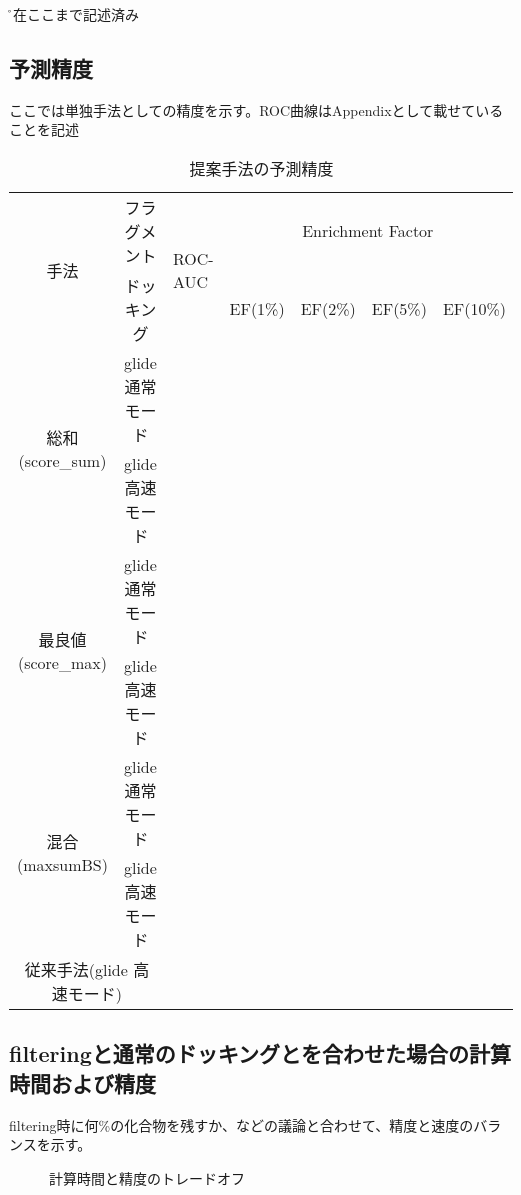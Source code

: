 \r{現在ここまで記述済み}

\subsection{予測精度}
ここでは単独手法としての精度を示す。ROC曲線はAppendixとして載せていることを記述

\begin{table}[htb] \centering
	\caption{提案手法の予測精度}
	\label{tb:filtering_accuracy}
	\begin{tabular}{c|c|lllll|}
	\multirow{2}{*}{手法}				&フラグメント		&\multirow{2}{*}{ROC-AUC}	&\multicolumn{4}{c}{Enrichment Factor}	\\
									&ドッキング		&						&EF(1\%)	&EF(2\%)	&EF(5\%)	&EF(10\%)	\\ \hline
	\multirow{2}{*}{総和(score\_sum)}		&glide 通常モード	&						&		&		&		&			\\
									&glide 高速モード	&						&		&		&		&			\\
	\multirow{2}{*}{最良値(score\_max)}	&glide 通常モード	&						&		&		&		&			\\
									&glide 高速モード	&						&		&		&		&			\\
	\multirow{2}{*}{混合(maxsumBS)}		&glide 通常モード	&						&		&		&		&			\\
									&glide 高速モード	&						&		&		&		&			\\ \hline
	\multicolumn{2}{c|}{従来手法(glide 高速モード)}			&						&		&		&		&			\\ \hline
	\end{tabular}
\end{table}

\subsection{filteringと通常のドッキングとを合わせた場合の計算時間および精度}
filtering時に何\%の化合物を残すか、などの議論と合わせて、精度と速度のバランスを示す。
\begin{figure}[htp]
 \begin{center}
  \caption{計算時間と精度のトレードオフ}
  \label{fig:trade_off}
 \end{center}
\end{figure}
